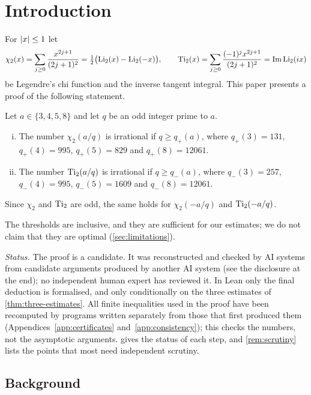 \section{Introduction}\label{sec:introduction}

For $\left\lvert x\right\rvert\le 1$ let
\[
  \chi_2(x)=\sum_{j\ge0}\frac{x^{2j+1}}{(2j+1)^2}=\tfrac12\bigl(\operatorname{Li}_2(x)-\operatorname{Li}_2(-x)\bigr),
  \qquad
  \operatorname{Ti}_2(x)=\sum_{j\ge0}\frac{(-1)^jx^{2j+1}}{(2j+1)^2}=\operatorname{Im}\operatorname{Li}_2(ix)
\]
be Legendre's chi function and the inverse tangent integral. This paper presents a proof of the
following statement.

\begin{theorem}\label{thm:main}
Let $a\in\{3,4,5,8\}$ and let $q$ be an odd integer prime to $a$.
\begin{enumerate}[(i)]
\item The number $\chi_2(a/q)$ is irrational if $q\ge q_+(a)$, where
$q_+(3)=131$, $q_+(4)=995$, $q_+(5)=829$ and $q_+(8)=12061$.
\item The number $\operatorname{Ti}_2(a/q)$ is irrational if $q\ge q_-(a)$, where
$q_-(3)=257$, $q_-(4)=995$, $q_-(5)=1609$ and $q_-(8)=12061$.
\end{enumerate}
Since $\chi_2$ and $\operatorname{Ti}_2$ are odd, the same holds for $\chi_2(-a/q)$ and $\operatorname{Ti}_2(-a/q)$.
\end{theorem}

The thresholds are inclusive, and they are sufficient for our estimates; we do not claim that
they are optimal (\cref{sec:limitations}).

\emph{Status.} The proof is a candidate. It was reconstructed and checked by AI systems from
candidate arguments produced by another AI system (see the disclosure at the end); no
independent human expert has reviewed it. In Lean only the final deduction is formalised, and
only conditionally on the three estimates of \cref{thm:three-estimates}. All finite
inequalities used in the proof have been recomputed by programs written separately from those
that first produced them (Appendices~\ref{app:certificates} and~\ref{app:consistency}); this
checks the numbers, not the asymptotic arguments.  gives the status of
each step, and \cref{rem:scrutiny} lists the points that most need independent scrutiny.

\subsection{Background}\label{subsec:background}

